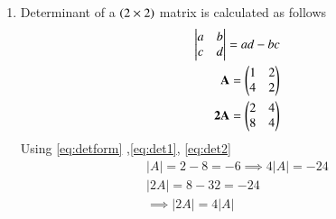 \renewcommand{\theequation}{\theenumi}
\begin{enumerate}[label=\thesection.\arabic*.,ref=\thesection.\theenumi]

\item Determinant of a $\left(2 \times 2\right)$ matrix is calculated as follows
\begin{align}
\begin{vmatrix} a & b \\ c & d \end{vmatrix} = ad-bc
\label{eq:detform}
\\
\mathbf{A}=\begin{pmatrix}1&2\\4&2\end{pmatrix}
\label{eq:det1}
\\
\mathbf{2A}=\begin{pmatrix}2&4\\8&4\end{pmatrix}
\label{eq:det2}
\end{align}
Using \ref{eq:detform} ,\ref{eq:det1}, \ref{eq:det2}
\begin{align}
|A|=2-8=-6 \implies 4|A|=-24
\\
|2A|= 8-32=-24
\\
\implies |2A|=4|A|
\end{align}
\end{enumerate}
